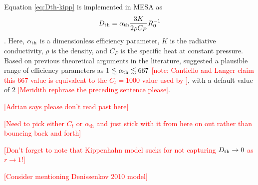 Equation \eqref{eq:Dth-kipp} is implemented in MESA as
\begin{equation} \label{eq:Dth-kipp-MESA}
    \Dth = \alpha_{\rm{th}} \frac{3 K}{2\rho C_P}R_0^{-1}
\end{equation}
\citep[see Eq.~(14) of][]{mesa2}. 
Here, $\alpha_{\rm{th}}$ is a dimensionless efficiency parameter, $K$ is the radiative conductivity, $\rho$ is the density, and $C_P$ is the specific heat at constant pressure. 
Based on previous theoretical arguments in the literature, \citet{mesa2} suggested a plausible range of efficiency parameters as $1 \lesssim \alpha_{\rm{th}} \lesssim 667$ \textcolor{red}{[note: Cantiello and Langer claim this 667 value is equivalent to the $C_t = 1000$ value used by \citet{charbonnel_thermohaline_2007}]}, with a default value of $2$ \textcolor{red}{[Meridith rephrase the preceding sentence please]}. 

\textcolor{red}{[Adrian says please don't read past here]}

\textcolor{red}{[Need to pick either $C_t$ or $\alpha_\mathrm{th}$ and just stick with it from here on out rather than bouncing back and forth]}

\textcolor{red}{[Don't forget to note that Kippenhahn model sucks for not capturing $D_\mathrm{th} \to 0$ as $r \to 1$!]}

\textcolor{red}{[Consider mentioning Denissenkov 2010 model]}


